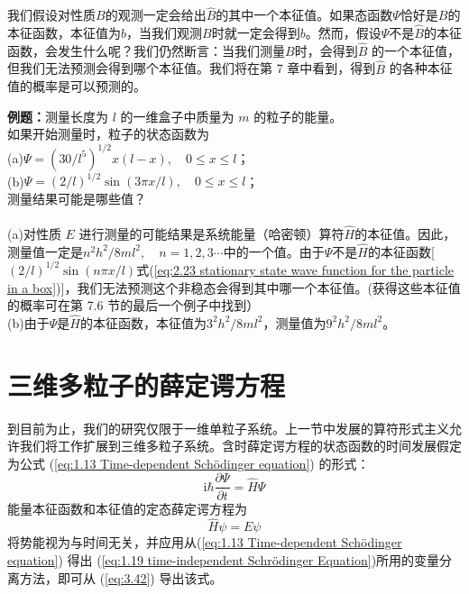 	我们假设对性质$B$的观测一定会给出$\hat{B}$的其中一个本征值。如果态函数$\Psi$恰好是$B$的本征函数，本征值为$b$，当我们观测$B$时就一定会得到$b$。然而，假设$\Psi$不是$\hat{B}$的本征函数，会发生什么呢？我们仍然断言：当我们测量$B$时，会得到$\hat{B}$ 的一个本征值，但我们无法预测会得到哪个本征值。我们将在第 7 章中看到，得到$\hat{B}$ 的各种本征值的概率是可以预测的。
	\begin{examplebox}
		\textbf{例题：}测量长度为 $l$ 的一维盒子中质量为 $m$ 的粒子的能量。\\

		如果开始测量时，粒子的状态函数为\\
		(a)$\Psi = \left(30/l^5\right)^{1/2}x\left(l-x\right), \quad 0 \le x \le l$；\\
		(b)$\Psi = \left(2/l\right)^{1/2}\sin\left(3\pi x/l\right), \quad 0 \le x \le l$；\\
		测量结果可能是哪些值？\\
		\\
		(a)对性质 $E$ 进行测量的可能结果是系统能量（哈密顿）算符$\hat{H}$的本征值。因此，测量值一定是$n^2h^2/8ml^2, \quad n = 1,2,3\cdots$中的一个值。由于$\Psi$不是$\hat{H}$的本征函数[$\left(2/l\right)^{1/2}\sin\left(n\pi x/l\right)$式(\ref{eq:2.23 stationary state wave function for the particle in a box})]，我们无法预测这个非稳态会得到其中哪一个本征值。(获得这些本征值的概率可在第 7.6 节的最后一个例子中找到）\\
		(b)由于$\Psi$是$\hat{H}$的本征函数，本征值为$3^2h^2/8ml^2$，测量值为$9^2h^2/8ml^2$。
	\end{examplebox}
	
\section{三维多粒子的薛定谔方程}
\label{sec:3.4 The Three-Dimensional, Many-Particle Schrödinger Equation}
	到目前为止，我们的研究仅限于一维单粒子系统。上一节中发展的算符形式主义允许我们将工作扩展到三维多粒子系统。含时薛定谔方程的状态函数的时间发展假定为公式 (\ref{eq:1.13 Time-dependent Schödinger equation}) 的形式：
	\begin{equation}
		\boxed{
			\mathrm{i}\hbar\frac{\partial \Psi}{\partial t} = \hat{H}\Psi
		}
		\label{eq:3.42}
	\end{equation}
	能量本征函数和本征值的定态薛定谔方程为
	\begin{equation}
		\boxed{
			\hat{H}\psi = E\psi
		}
		\label{eq:3.43}
	\end{equation}
	将势能视为与时间无关，并应用从(\ref{eq:1.13 Time-dependent Schödinger equation}) 得出 (\ref{eq:1.19 time-independent Schrödinger Equation})所用的变量分离方法，即可从 (\ref{eq:3.42}) 导出该式。

